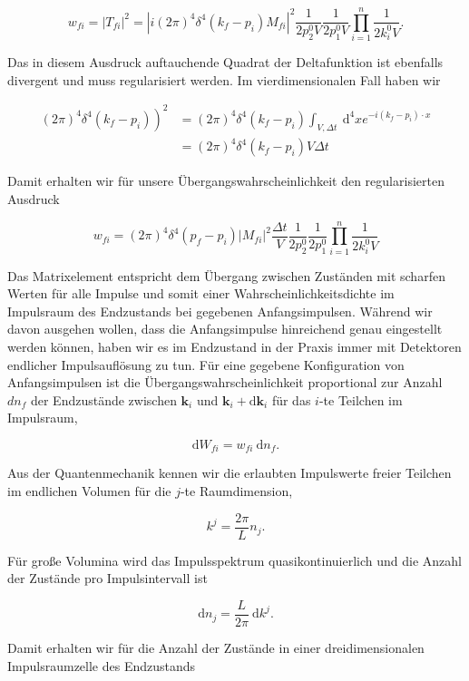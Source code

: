 \documentclass[10pt, letterpaper]{article}
\begin{document}
$$
w_{f i}=\left|T_{f i}\right|^{2}=\left|i(2 \pi)^{4} \delta^{4}\left(k_{f}-p_{i}\right) M_{f i}\right|^{2} \frac{1}{2 p_{2}^{0} V} \frac{1}{2 p_{1}^{0} V} \prod_{i=1}^{n} \frac{1}{2 k_{i}^{0} V} .
$$

Das in diesem Ausdruck auftauchende Quadrat der Deltafunktion ist ebenfalls divergent und muss regularisiert werden. Im vierdimensionalen Fall haben wir

$$
\begin{aligned}
\left.(2 \pi)^{4} \delta^{4}\left(k_{f}-p_{i}\right)\right)^{2} & =(2 \pi)^{4} \delta^{4}\left(k_{f}-p_{i}\right) \int_{V, \Delta t} \mathrm{~d}^{4} x e^{-i\left(k_{f}-p_{i}\right) \cdot x} \\
& =(2 \pi)^{4} \delta^{4}\left(k_{f}-p_{i}\right) V \Delta t
\end{aligned}
$$

Damit erhalten wir für unsere Übergangswahrscheinlichkeit den regularisierten Ausdruck

$$
w_{f i}=(2 \pi)^{4} \delta^{4}\left(p_{f}-p_{i}\right)\left|M_{f i}\right|^{2} \frac{\Delta t}{V} \frac{1}{2 p_{2}^{0}} \frac{1}{2 p_{1}^{0}} \prod_{i=1}^{n} \frac{1}{2 k_{i}^{0} V}
$$

Das Matrixelement entspricht dem Übergang zwischen Zuständen mit scharfen Werten für alle Impulse und somit einer Wahrscheinlichkeitsdichte im Impulsraum des Endzustands bei gegebenen Anfangsimpulsen. Während wir davon ausgehen wollen, dass die Anfangsimpulse hinreichend genau eingestellt werden können, haben wir es im Endzustand in der Praxis immer mit Detektoren endlicher Impulsauflösung zu tun. Für eine gegebene Konfiguration von Anfangsimpulsen ist die Übergangswahrscheinlichkeit proportional zur Anzahl $d n_{f}$ der Endzustände zwischen $\mathbf{k}_{i}$ und $\mathbf{k}_{i}+\mathrm{d} \mathbf{k}_{i}$ für das $i$-te Teilchen im Impulsraum,

$$
\mathrm{d} W_{f i}=w_{f i} \mathrm{~d} n_{f} .
$$

Aus der Quantenmechanik kennen wir die erlaubten Impulswerte freier Teilchen im endlichen Volumen für die $j$-te Raumdimension,

$$
k^{j}=\frac{2 \pi}{L} n_{j} .
$$

Für große Volumina wird das Impulsspektrum quasikontinuierlich und die Anzahl der Zustände pro Impulsintervall ist

$$
\mathrm{d} n_{j}=\frac{L}{2 \pi} \mathrm{~d} k^{j} .
$$

Damit erhalten wir für die Anzahl der Zustände in einer dreidimensionalen Impulsraumzelle des Endzustands
\end{document}
